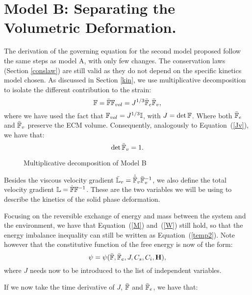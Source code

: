\section{Model B: Separating the Volumetric Deformation.}
\label{modelB}
The derivation of the governing equation for the second model proposed follow the same steps as model A, with only few changes. The conservation laws (Section \ref{conslaw}) are still valid as they do not depend on the specific kinetics model chosen. As discussed in Section \ref{kin}, we use multiplicative decomposition to isolate the different contribution to the strain:
\begin{equation}
\mathbb{F}= \bar{\mathbb{F}} \mathbb{F}_{vol}= J^{1/3} \bar{\mathbb{F}}_e \bar{\mathbb{F}}_v,\label{mol2}
\end{equation}
where we have used the fact that $\mathbb{F}_{vol}=J^{1/3}\mathbb{I}$, with $J=\det \mathbb{F}$. Where both $\bar{\mathbb{F}}_e$ and $\bar{\mathbb{F}}_v$ preserve the ECM volume. Consequently, analogously to Equation~(\ref{Jv}), we have that:
\begin{equation}
\det \bar{\mathbb{F}}_v = 1.
\end{equation}
\begin{figure}
	\Large
	\def\svgwidth{1\linewidth}
	
	\caption{Multiplicative decomposition of Model B}
\end{figure}

Besides the viscous velocity gradient $\bar{\mathbb{L}}_v=\dot{\bar{\mathbb{F}}}_v\bar{\mathbb{F}}_v^{-1}$, we also define the total velocity gradient $\mathbb{L}=\dot{\mathbb{F}}\mathbb{F}^{-1}$. These are the two variables we will be using to describe the kinetics of the solid phase deformation. 

Focusing on the reversible exchange of energy and mass between the system and the environment, we have that Equation~(\ref{M}) and~(\ref{W}) still hold, so that the energy imbalance inequality can still be written as Equation~(\ref{temp2}). Note however that the constitutive function of the free energy is now of the form:
\begin{equation}
\psi=\psi(\bar{\mathbb{F}},\bar{\mathbb{F}}_e, J , C_s,C_i,\mathbf{H}),\label{aptemp1}
\end{equation}
where $J$ needs now to be introduced to the list of independent variables. 

If we now take the time derivative of $J$, $\bar{\mathbb{F}}$ and $\bar{\mathbb{F}}_e$, we have that:

